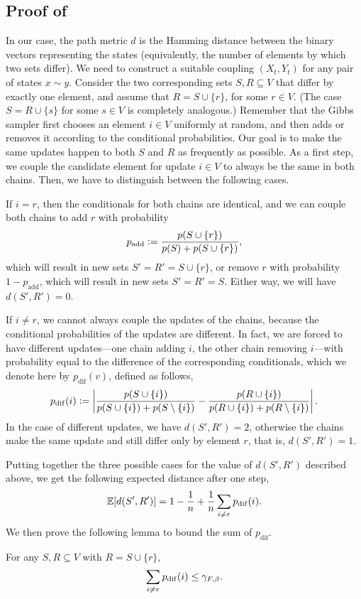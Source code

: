 \subsection{Proof of }
In our case, the path metric $d$ is the Hamming distance between the binary vectors representing the states (equivalently, the number of elements by which two sets differ).
We need to construct a suitable coupling $(X_t, Y_t)$ for any pair of states $x \sim y$.
Consider the two corresponding sets $S, R \subseteq V$ that differ by exactly one element, and assume that $R = S \cup \{r\}$, for some $r \in V$. (The case $S = R \cup \{s\}$ for some $s \in V$ is completely analogous.)
Remember that the Gibbs sampler first chooses an element $i \in V$ uniformly at random, and then adds or removes it according to the conditional probabilities.
Our goal is to make the same updates happen to both $S$ and $R$ as frequently as possible.
As a first step, we couple the candidate element for update $i \in V$ to always be the same in both chains.
Then, we have to distinguish between the following cases.

If $i = r$, then the conditionals for both chains are identical, and we can couple both chains to add $r$ with probability
\begin{align*}
p_{\mathrm{add}} \vcentcolon= \frac{p(S \cup \{r\})}{p(S) + p(S \cup \{r\})},
\end{align*}
which will result in new sets $S' = R' = S \cup \{r\}$, or remove $r$ with probability $1 - p_{\mathrm{add}}$, which will result in new sets $S' = R' = S$.
Either way, we will have $d(S', R') = 0$.
  
If $i \neq r$, we cannot always couple the updates of the chains, because the conditional probabilities of the updates are different.
In fact, we are forced to have different updates---one chain adding $i$, the other chain removing $i$---with probability equal to the difference of the corresponding conditionals, which we denote here by $p_{\mathrm{dif}}(v)$, defined as follows,
\begin{align*}
  p_{\mathrm{dif}}(i) \vcentcolon= \left|\frac{p(S \cup \{i\})}{p(S \cup \{i\}) + p(S \setminus \{i\})} - \frac{p(R \cup \{i\})}{p(R \cup \{i\}) + p(R \setminus \{i\})}\right|.
\end{align*}
In the case of different updates, we have $d(S', R') = 2$, otherwise the chains make the same update and still differ only by element $r$, that is, $d(S', R') = 1$.

Putting together the three possible cases for the value of $d(S', R')$ described above, we get the following expected distance after one step,
\begin{align*}
  \mathbb{E}[d(S', R')] = 1 -\frac{1}{n} + \frac{1}{n}\sum_{i \neq r}p_{\mathrm{dif}}(i).
\end{align*}
We then prove the following lemma to bound the sum of $p_{\mathrm{dif}}$.
\begin{lemma}
For any $S, R \subseteq V$ with $R = S \cup \{r\}$,
\begin{align*}
  \sum_{i \neq r}p_{\mathrm{dif}}(i) \leq \gamma_{F,\beta}.
\end{align*}
\end{lemma}


